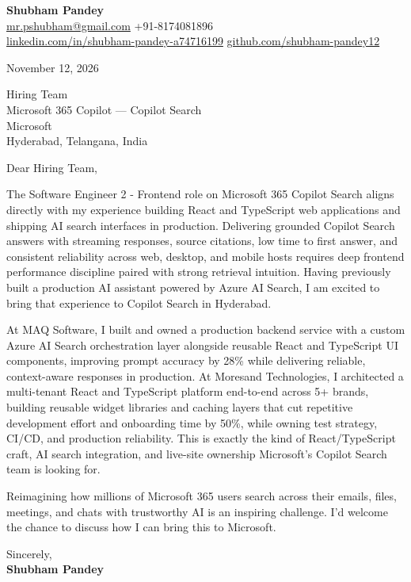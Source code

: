 \documentclass[a4paper,11pt]{article}
\begin{document}
\textbf{\Large Shubham Pandey}\\
\href{mailto:mr.pshubham@gmail.com}{mr.pshubham@gmail.com} \quad +91-8174081896\\
\href{https://www.linkedin.com/in/shubham-pandey-a74716199/}{linkedin.com/in/shubham-pandey-a74716199} \quad
\href{https://github.com/shubham-pandey12}{github.com/shubham-pandey12}

\vspace{1em}
November 12, 2026

\vspace{1em}
Hiring Team\\
Microsoft 365 Copilot --- Copilot Search\\
Microsoft\\
Hyderabad, Telangana, India

\vspace{1em}
Dear Hiring Team,

The Software Engineer 2 - Frontend role on Microsoft 365 Copilot Search aligns directly with my experience building React and TypeScript web applications and shipping AI search interfaces in production. Delivering grounded Copilot Search answers with streaming responses, source citations, low time to first answer, and consistent reliability across web, desktop, and mobile hosts requires deep frontend performance discipline paired with strong retrieval intuition. Having previously built a production AI assistant powered by Azure AI Search, I am excited to bring that experience to Copilot Search in Hyderabad.

At MAQ Software, I built and owned a production backend service with a custom Azure AI Search orchestration layer alongside reusable React and TypeScript UI components, improving prompt accuracy by 28\% while delivering reliable, context-aware responses in production. At Moresand Technologies, I architected a multi-tenant React and TypeScript platform end-to-end across 5+ brands, building reusable widget libraries and caching layers that cut repetitive development effort and onboarding time by 50\%, while owning test strategy, CI/CD, and production reliability. This is exactly the kind of React/TypeScript craft, AI search integration, and live-site ownership Microsoft's Copilot Search team is looking for.

Reimagining how millions of Microsoft 365 users search across their emails, files, meetings, and chats with trustworthy AI is an inspiring challenge. I'd welcome the chance to discuss how I can bring this to Microsoft.

\vspace{1em}
Sincerely,\\[0.5em]
\textbf{Shubham Pandey}
\end{document}
